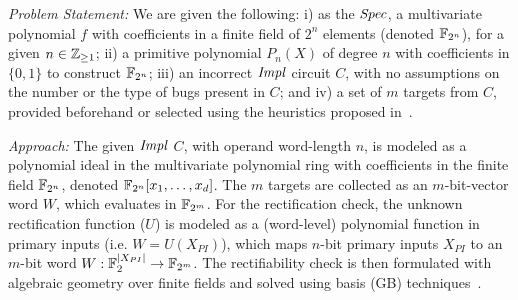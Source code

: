 {\it Problem Statement:}
We are given the following: i) as the ${\it Spec}$, a multivariate
polynomial $f$ with coefficients in a finite field of $2^n$ elements
(denoted ${\mathbb{F}}_{2^n}$), for a given  $n\in {\mathbb{Z}}_{\geq 1}$; ii) a primitive
polynomial $P_n(X)$ of degree $n$ with coefficients in $\{0,1\}$
to construct ${\mathbb{F}}_{2^n}$; iii) an incorrect ${\it Impl}$ circuit $C$,
with no assumptions on the number or the type of bugs present in
$C$; and
iv) a set of $m$ targets from $C$, provided beforehand or selected using the heuristics 
proposed in~\cite{SS_Alan:DAC18,SS_Fujita:ISCAS19,SS_Roland:DAC19}.

{\it Approach:}
The given ${\it Impl}$ $C$, with operand word-length $n$, is modeled
as a polynomial ideal in the multivariate polynomial ring with
coefficients in the finite field ${\mathbb{F}}_{2^n}$, denoted ${\mathbb{F}}_{2^n}[x_1,\dots,x_d]$. 
The $m$ targets are
collected as an $m$-bit-vector word $W$, which evaluates in ${\mathbb{F}}_{2^m}$.
For the 
rectification check, the %
unknown rectification function ($U$) is  modeled as a (word-level)
polynomial function in primary inputs (i.e. $W = U(X_{PI})$), which maps 
$n$-bit primary inputs $X_{PI}$ to an $m$-bit word $W :{\mathbb{F}}_2^{|X_{PI}|} \rightarrow {\mathbb{F}}_{2^m}$.
The rectifiability check 
is then formulated with algebraic geometry over finite fields 
and solved using \Grobner basis (GB) techniques~\cite{gb_book}.

